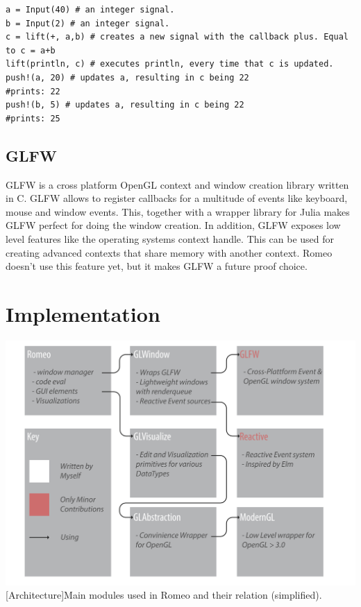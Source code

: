 \begin{lstlisting}
a = Input(40) # an integer signal.
b = Input(2) # an integer signal.
c = lift(+, a,b) # creates a new signal with the callback plus. Equal to c = a+b
lift(println, c) # executes println, every time that c is updated. 
push!(a, 20) # updates a, resulting in c being 22
#prints: 22
push!(b, 5) # updates a, resulting in c being 22
#prints: 25
\end{lstlisting}

\subsection{GLFW}
GLFW is a cross platform \ac{OpenGL} context and window creation library written in C.
GLFW allows to register callbacks for a multitude of events like keyboard, mouse and window events.
This, together with a wrapper library for Julia makes GLFW perfect for doing the window creation.
In addition, GLFW exposes low level features like the operating systems context handle.
This can be used for creating advanced contexts that share memory with another context.
Romeo doesn't use this feature yet, but it makes GLFW a future proof choice.


\section{Implementation}


\vspace{1em}
\begin{minipage}{\linewidth}
    \centering
    \includegraphics[width=0.9\linewidth]{graphics/architecture.pdf}
    [Architecture]{Main modules used in Romeo and their relation (simplified).}
    \label{fig:architecture} 
\end{minipage}


